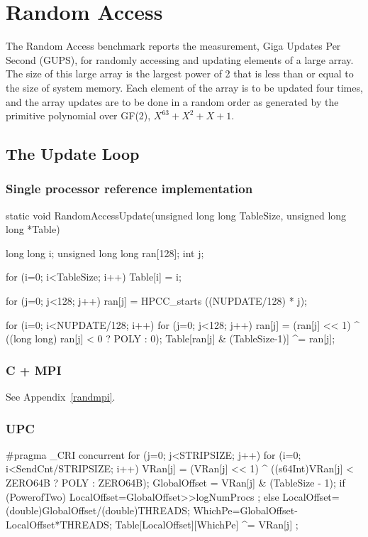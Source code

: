 \section{Random Access}
The Random Access benchmark reports the measurement, Giga Updates Per Second (GUPS),  
for randomly accessing and updating elements of a large array.  The size of 
this large array is the largest power of 2 that is less than or equal to the
size of system memory.  Each element of the array is to be updated four times, and the 
array updates are to be done in a random order as generated by the primitive polynomial
over GF(2), $X^{63} + X^2 + X + 1$.  

\subsection{The Update Loop}

\subsubsection{Single processor reference implementation}
\begin{C}
static void
RandomAccessUpdate(unsigned long long TableSize, unsigned long long *Table) {
  long long i;
  unsigned long long ran[128];              
  int j;

  for (i=0; i<TableSize; i++) Table[i] = i;

  for (j=0; j<128; j++) {
    ran[j] = HPCC_starts ((NUPDATE/128) * j);
  }

  for (i=0; i<NUPDATE/128; i++) {
    for (j=0; j<128; j++) {
      ran[j] = (ran[j] << 1) ^ ((long long) ran[j] < 0 ? POLY : 0);
      Table[ran[j] & (TableSize-1)] ^= ran[j];
    }
  }
}
\end{C}

\subsubsection{C + MPI}
See Appendix~\ref{randmpi}.

\subsubsection{UPC}
\begin{C}
#pragma _CRI concurrent
for (j=0; j<STRIPSIZE; j++) {
  for (i=0; i<SendCnt/STRIPSIZE; i++) {
    VRan[j] = (VRan[j] << 1) ^ ((s64Int)VRan[j]
               < ZERO64B ? POLY : ZERO64B);
    GlobalOffset = VRan[j] & (TableSize - 1);
    if (PowerofTwo)
      LocalOffset=GlobalOffset>>logNumProcs ;
    else
      LocalOffset=(double)GlobalOffset/(double)THREADS;
    WhichPe=GlobalOffset-LocalOffset*THREADS;
    Table[LocalOffset][WhichPe] ^= VRan[j] ;
  }
}
\end{C}


